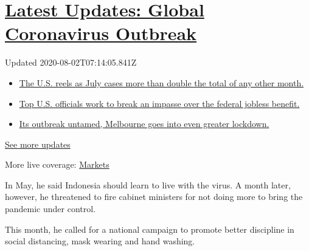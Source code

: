 \hypertarget{latest-updates-global-coronavirus-outbreak}{%
\section{\texorpdfstring{\href{https://www.nytimes.com/2020/08/01/world/coronavirus-covid-19.html?action=click\&pgtype=Article\&state=default\&region=MAIN_CONTENT_1\&context=storylines_live_updates}{Latest
Updates: Global Coronavirus
Outbreak}}{Latest Updates: Global Coronavirus Outbreak}}\label{latest-updates-global-coronavirus-outbreak}}

Updated 2020-08-02T07:14:05.841Z

\begin{itemize}
\tightlist
\item
  \href{https://www.nytimes.com/2020/08/01/world/coronavirus-covid-19.html?action=click\&pgtype=Article\&state=default\&region=MAIN_CONTENT_1\&context=storylines_live_updates\#link-34047410}{The
  U.S. reels as July cases more than double the total of any other
  month.}
\item
  \href{https://www.nytimes.com/2020/08/01/world/coronavirus-covid-19.html?action=click\&pgtype=Article\&state=default\&region=MAIN_CONTENT_1\&context=storylines_live_updates\#link-780ec966}{Top
  U.S. officials work to break an impasse over the federal jobless
  benefit.}
\item
  \href{https://www.nytimes.com/2020/08/01/world/coronavirus-covid-19.html?action=click\&pgtype=Article\&state=default\&region=MAIN_CONTENT_1\&context=storylines_live_updates\#link-2bc8948}{Its
  outbreak untamed, Melbourne goes into even greater lockdown.}
\end{itemize}

\href{https://www.nytimes.com/2020/08/01/world/coronavirus-covid-19.html?action=click\&pgtype=Article\&state=default\&region=MAIN_CONTENT_1\&context=storylines_live_updates}{See
more updates}

More live coverage:
\href{https://www.nytimes.com/live/2020/07/31/business/stock-market-today-coronavirus?action=click\&pgtype=Article\&state=default\&region=MAIN_CONTENT_1\&context=storylines_live_updates}{Markets}

In May, he said Indonesia should learn to live with the virus. A month
later, however, he threatened to fire cabinet ministers for not doing
more to bring the pandemic under control.

This month, he called for a national campaign to promote better
discipline in social distancing, mask wearing and hand washing.

